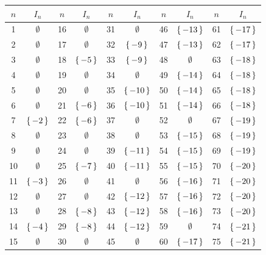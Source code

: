 \begin{center}
\begin{tabular}{|c|c||c|c||c|c||c|c||c|c|}
\hline
$n$ & $I_n$ & $n$ & $I_n$ & $n$ & $I_n$ & $n$ &  $I_n$ & $n$ & $I_n$ \\
\hline
1 & $\emptyset$ & 16 & $\emptyset$ & 31 & $\emptyset$ & 46 & $\left\{\,-13\,\right\}$ & 61 & $\left\{\,-17\,\right\}$\\
\hline
2 & $\emptyset$ & 17 & $\emptyset$ & 32 & $\left\{\,-9\,\right\}$ & 47 & $\left\{\,-13\,\right\}$ & 62 & $\left\{\,-17\,\right\}$\\
\hline
3 & $\emptyset$ & 18 & $\left\{\,-5\,\right\}$ & 33 & $\left\{\,-9\,\right\}$ & 48 & $\emptyset$ & 63 & $\left\{\,-18\,\right\}$\\
\hline
4 & $\emptyset$ & 19 & $\emptyset$ & 34 & $\emptyset$ & 49 & $\left\{\,-14\,\right\}$ & 64 & $\left\{\,-18\,\right\}$\\
\hline
5 & $\emptyset$ & 20 & $\emptyset$ & 35 & $\left\{\,-10\,\right\}$ & 50 & $\left\{\,-14\,\right\}$ & 65 & $\left\{\,-18\,\right\}$\\
\hline
6 & $\emptyset$ & 21 & $\left\{\,-6\,\right\}$ & 36 & $\left\{\,-10\,\right\}$ & 51 & $\left\{\,-14\,\right\}$ & 66 & $\left\{\,-18\,\right\}$\\
\hline
7 & $\left\{\,-2\,\right\}$ & 22 & $\left\{\,-6\,\right\}$ & 37 & $\emptyset$ & 52 & $\emptyset$ & 67 & $\left\{\,-19\,\right\}$\\
\hline
8 & $\emptyset$ & 23 & $\emptyset$ & 38 & $\emptyset$ & 53 & $\left\{\,-15\,\right\}$ & 68 & $\left\{\,-19\,\right\}$\\
\hline
9 & $\emptyset$ & 24 & $\emptyset$ & 39 & $\left\{\,-11\,\right\}$ & 54 & $\left\{\,-15\,\right\}$ & 69 & $\left\{\,-19\,\right\}$\\
\hline
10 & $\emptyset$ &25 & $\left\{\,-7\,\right\}$ &40  & $\left\{\,-11\,\right\}$ &55  & $\left\{\,-15\,\right\}$ &70  & $\left\{\,-20\,\right\}$\\
\hline
11 & $\left\{\,-3\,\right\}$ &26  & $\emptyset$ &41  & $\emptyset$ &56  & $\left\{\,-16\,\right\}$ &71  & $\left\{\,-20\,\right\}$\\
\hline
12 & $\emptyset$ &27  & $\emptyset$ &42  & $\left\{\,-12\,\right\}$ &57  & $\left\{\,-16\,\right\}$ &72  & $\left\{\,-20\,\right\}$\\
\hline
13 & $\emptyset$ &28  & $\left\{\,-8\,\right\}$ &43  & $\left\{\,-12\,\right\}$ &58  & $\left\{\,-16\,\right\}$ &73  & $\left\{\,-20\,\right\}$\\
\hline
14 & $\left\{\,-4\,\right\}$ &29  & $\left\{\,-8\,\right\}$ &44  & $\left\{\,-12\,\right\}$ &59  & $\emptyset$ &74  & $\left\{\,-21\,\right\}$\\
\hline
15 & $\emptyset$ &30  & $\emptyset$ &45  & $\emptyset$ &60  & $\left\{\,-17\,\right\}$ &75  & $\left\{\,-21\,\right\}$\\
\hline
\end{tabular}
\end{center}
